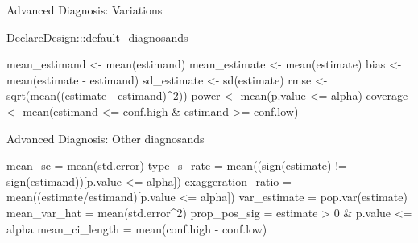 \documentclass[
  11pt,
  ignorenonframetext,
]{beamer}
\newenvironment{Shaded}{\begin{snugshade}}{\end{snugshade}}
\newcommand{\DecValTok}[1]{\textcolor[rgb]{0.68,0.00,0.00}{#1}}
\newcommand{\FunctionTok}[1]{\textcolor[rgb]{0.28,0.35,0.67}{#1}}
\newcommand{\NormalTok}[1]{\textcolor[rgb]{0.00,0.23,0.31}{#1}}
\newcommand{\OtherTok}[1]{\textcolor[rgb]{0.00,0.23,0.31}{#1}}
\newcommand{\SpecialCharTok}[1]{\textcolor[rgb]{0.37,0.37,0.37}{#1}}
\begin{document}
\begin{frame}[fragile]{Advanced Diagnosis: Variations}
\protect\hypertarget{advanced-diagnosis-variations}{}
\begin{Shaded}
\begin{Highlighting}[]
\NormalTok{DeclareDesign}\SpecialCharTok{:::}\NormalTok{default\_diagnosands}
\end{Highlighting}
\end{Shaded}

\begin{Shaded}
\begin{Highlighting}[]
\NormalTok{    mean\_estimand }\OtherTok{\textless{}{-}} \FunctionTok{mean}\NormalTok{(estimand)}
\NormalTok{    mean\_estimate }\OtherTok{\textless{}{-}} \FunctionTok{mean}\NormalTok{(estimate)}
\NormalTok{    bias }\OtherTok{\textless{}{-}} \FunctionTok{mean}\NormalTok{(estimate }\SpecialCharTok{{-}}\NormalTok{ estimand)}
\NormalTok{    sd\_estimate }\OtherTok{\textless{}{-}} \FunctionTok{sd}\NormalTok{(estimate)}
\NormalTok{    rmse }\OtherTok{\textless{}{-}} \FunctionTok{sqrt}\NormalTok{(}\FunctionTok{mean}\NormalTok{((estimate }\SpecialCharTok{{-}}\NormalTok{ estimand)}\SpecialCharTok{\^{}}\DecValTok{2}\NormalTok{))}
\NormalTok{    power }\OtherTok{\textless{}{-}} \FunctionTok{mean}\NormalTok{(p.value }\SpecialCharTok{\textless{}=}\NormalTok{ alpha)}
\NormalTok{    coverage }\OtherTok{\textless{}{-}} \FunctionTok{mean}\NormalTok{(estimand }\SpecialCharTok{\textless{}=}\NormalTok{ conf.high }\SpecialCharTok{\&}\NormalTok{ estimand }\SpecialCharTok{\textgreater{}=}\NormalTok{ conf.low)}
\end{Highlighting}
\end{Shaded}
\end{frame}

\begin{frame}[fragile]{Advanced Diagnosis: Other diagnosands}
\protect\hypertarget{advanced-diagnosis-other-diagnosands}{}
\begin{Shaded}
\begin{Highlighting}[]
\NormalTok{    mean\_se }\OtherTok{=} \FunctionTok{mean}\NormalTok{(std.error)}
\NormalTok{    type\_s\_rate }\OtherTok{=} \FunctionTok{mean}\NormalTok{((}\FunctionTok{sign}\NormalTok{(estimate) }\SpecialCharTok{!=} \FunctionTok{sign}\NormalTok{(estimand))[p.value }\SpecialCharTok{\textless{}=}\NormalTok{ alpha])}
\NormalTok{    exaggeration\_ratio }\OtherTok{=} \FunctionTok{mean}\NormalTok{((estimate}\SpecialCharTok{/}\NormalTok{estimand)[p.value }\SpecialCharTok{\textless{}=}\NormalTok{ alpha])}
\NormalTok{    var\_estimate }\OtherTok{=} \FunctionTok{pop.var}\NormalTok{(estimate)}
\NormalTok{    mean\_var\_hat }\OtherTok{=} \FunctionTok{mean}\NormalTok{(std.error}\SpecialCharTok{\^{}}\DecValTok{2}\NormalTok{)}
\NormalTok{    prop\_pos\_sig }\OtherTok{=}\NormalTok{ estimate }\SpecialCharTok{\textgreater{}} \DecValTok{0} \SpecialCharTok{\&}\NormalTok{ p.value }\SpecialCharTok{\textless{}=}\NormalTok{ alpha}
\NormalTok{    mean\_ci\_length }\OtherTok{=} \FunctionTok{mean}\NormalTok{(conf.high }\SpecialCharTok{{-}}\NormalTok{ conf.low)}
\end{Highlighting}
\end{Shaded}
\end{frame}
\end{document}
